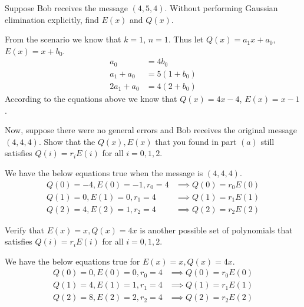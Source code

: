 \documentclass[11pt]{article}
\begin{document}
\begin{Parts}

    \Part Suppose Bob receives the message $(4,5,4)$. Without performing Gaussian elimination explicitly, find $E(x)$ and $Q(x)$. 

    \begin{Answer}
        From the scenario we know that $k = 1$, $n = 1$. Thus let $Q(x) = a_1x + a_0$, $E(x) = x + b_0$. 
        \begin{align*}
            a_0         &= 4b_0 \\
            a_1 + a_0   &= 5(1 + b_0) \\
            2a_1 + a_0  &= 4(2 + b_0)
        \end{align*}
        According to the equations above we know that $Q(x) = 4x - 4$, $E(x) = x - 1$. 
    \end{Answer}

    \Part Now, suppose there were no general errors and Bob receives the original message $(4,4,4)$. Show that the $Q(x), E(x)$ 
          that you found in part $(a)$ still satisfies $Q(i) = r_iE(i)$ for all $i = 0,1,2$. 

    \begin{Answer}
        We have the below equations true when the message is $(4,4,4)$. 
        \begin{align*}
            Q(0) = -4, E(0) = -1, r_0 = 4 &\implies Q(0) = r_0E(0) \\
            Q(1) = 0, E(1) = 0, r_1 = 4   &\implies Q(1) = r_1E(1) \\
            Q(2) = 4, E(2) = 1, r_2 = 4   &\implies Q(2) = r_2E(2)
        \end{align*}
    \end{Answer}

    \Part Verify that $E(x) = x, Q(x) = 4x$ is another possible set of polynomials that satisfies $Q(i) = r_iE(i)$ for all 
          $i = 0, 1, 2$. 
    
    \begin{Answer}
        We have the below equations true for $E(x) = x, Q(x) = 4x$.
        \begin{align*}
            Q(0) = 0, E(0) = 0, r_0 = 4 &\implies Q(0) = r_0E(0) \\
            Q(1) = 4, E(1) = 1, r_1 = 4 &\implies Q(1) = r_1E(1) \\
            Q(2) = 8, E(2) = 2, r_2 = 4 &\implies Q(2) = r_2E(2)
        \end{align*}
    \end{Answer}


\end{Parts}
\end{document}
